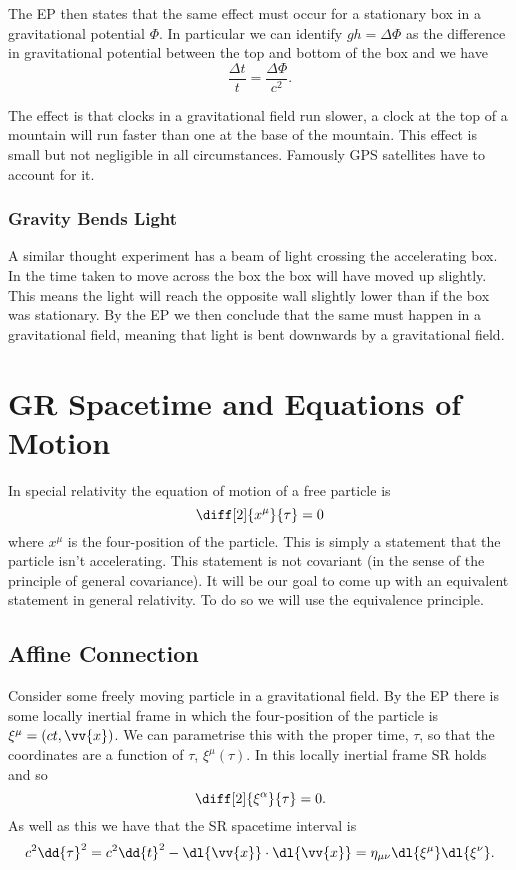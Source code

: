 \documentclass[fleqn]{NotesClass}
\begin{document}
    The EP then states that the same effect must occur for a stationary box in a gravitational potential \(\Phi\).
    In particular we can identify \(gh = \Delta \Phi\) as the difference in gravitational potential between the top and bottom of the box and we have
    \begin{equation}
        \frac{\Delta t}{t} = \frac{\Delta \Phi}{c^2}.
    \end{equation}
    
    The effect is that clocks in a gravitational field run slower, a clock at the top of a mountain will run faster than one at the base of the mountain.
    This effect is small but not negligible in all circumstances.
    Famously GPS satellites have to account for it.
    
    \subsection{Gravity Bends Light}
    A similar thought experiment has a beam of light crossing the accelerating box.
    In the time taken to move across the box the box will have moved up slightly.
    This means the light will reach the opposite wall slightly lower than if the box was stationary.
    By the EP we then conclude that the same must happen in a gravitational field, meaning that light is bent downwards by a gravitational field.
    
    \chapter{GR Spacetime and Equations of Motion}
    In special relativity the equation of motion of a free particle is
    \begin{equation}
        \diff[2]{x^\mu}{\tau} = 0
    \end{equation}
    where \(x^\mu\) is the four-position of the particle.
    This is simply a statement that the particle isn't accelerating.
    This statement is not covariant (in the sense of the principle of general covariance).
    It will be our goal to come up with an equivalent statement in general relativity.
    To do so we will use the equivalence principle.
    
    \section{Affine Connection}
    Consider some freely moving particle in a gravitational field.
    By the EP there is some locally inertial frame in which the four-position of the particle is \(\xi^\mu = (ct, \vv{x})\).
    We can parametrise this with the proper time, \(\tau\), so that the coordinates are a function of \(\tau\), \(\xi^\mu(\tau)\).
    In this locally inertial frame SR holds and so
    \begin{equation}\label{eqn:LIF EOM}
        \diff[2]{\xi^\alpha}{\tau} = 0.
    \end{equation}
    As well as this we have that the SR spacetime interval is
    \begin{equation}
        c^2 \dd{\tau}^2 = c^2\dd{t}^2 - \dl{\vv{x}} \cdot \dl{\vv{x}} = \eta_{\mu\nu}\dl{\xi^\mu}\dl{\xi^\nu}.
    \end{equation}
    
\end{document}
